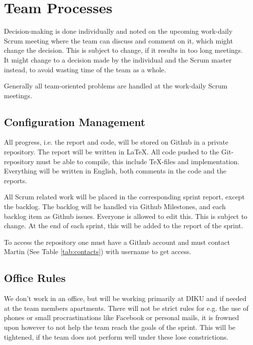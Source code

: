\section{Team Processes}

Decision-making is done individually and noted on the upcoming work-daily Scrum meeting where the team can discuss and comment on it, which might change the decision. This is subject to change, if it results in too long meetings. It might change to a decision made by the individual and the Scrum master instead, to avoid wasting time of the team as a whole.

Generally all team-oriented problems are handled at the work-daily Scrum meetings.

\subsection{Configuration Management}
All progress, i.e. the report and code, will be stored on Github in a private repository.
The report will be written in \LaTeX.
All code pushed to the Git-repository must be able to compile, this include \TeX-files and implementation.
Everything will be written in English, both comments in the code and the reports.

All Scrum related work will be placed in the corresponding sprint report, except the backlog. The backlog will be handled via Github Milestones, and each backlog item as Github issues. Everyone is allowed to edit this. This is subject to change. At the end of each sprint, this will be added to the report of the sprint.

To access the repository one must have a Github account and must contact Martin (See Table \ref{tab:contacts}) with username to get access.


\subsection{Office Rules}
We don't work in an office, but will be working primarily at DIKU and if needed at the team members apartments. There will not be strict rules for e.g. the use of phones or small procrastinations like Facebook or personal mails, it is frowned upon however to not help the team reach the goals of the sprint. This will be tightened, if the team does not perform well under these lose constrictions.

